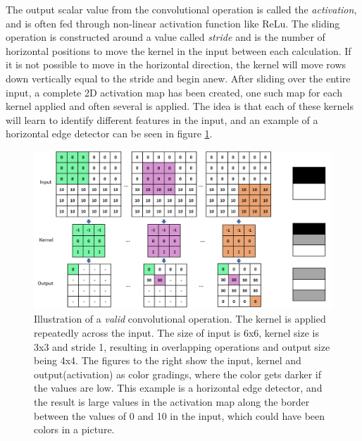      The output scalar value from the convolutional operation is called the \textit{activation}, and is often fed through non-linear activation function like ReLu\cite{o2015introduction_convolutions}. The sliding operation is constructed around a value called \textit{stride} and is the number of horizontal positions to move the kernel in the input between each calculation. If it is not possible to move in the horizontal direction, the kernel will move rows down vertically equal to the stride and begin anew. After sliding over the entire input, a complete 2D activation map has been created, one such map for each kernel applied and often several is applied. The idea is that each of these kernels will learn to identify different features in the input, and an example of a horizontal edge detector can be seen in figure \ref{convolutional_fig}. 
    \begin{figure}[H]
        \centering
        \includegraphics[scale=0.4]{figures/convolutions.png}
        \caption[Horizontal edge detector example]{Illustration of a \textit{valid} convolutional operation. The kernel is applied repeatedly across the input. The size of input is 6x6, kernel size is 3x3 and stride 1, resulting in overlapping operations and output size being 4x4. The figures to the right show the input, kernel and output(activation) as color gradings, where the color gets darker if the values are low. This example is a horizontal edge detector, and the result is large values in the activation map along the border between the values of 0 and 10 in the input, which could have been colors in a picture.}
      	\medskip 
        \label{convolutional_fig}
    \end{figure}
    
